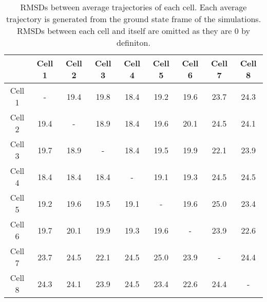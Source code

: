 \begin{table}[ht]
\centering
  \caption{RMSDs between average trajectories of each cell. Each average trajectory is generated from the ground state frame of the simulations. RMSDs between each cell and itself are omitted as they are 0 by definiton.}
  \label{tab:rmsd_avg_between_cells}
  \begin{tabular}{S | S S S S S S S S}
     & {Cell 1} & {Cell 2} & {Cell 3} & {Cell 4} & {Cell 5} & {Cell 6} & {Cell 7} & {Cell 8} \\
  \midrule
    {Cell 1} &  {-} & 19.4 & 19.8 & 18.4 & 19.2 & 19.6 & 23.7 & 24.3 \\
    {Cell 2} & 19.4 &  {-} & 18.9 & 18.4 & 19.6 & 20.1 & 24.5 & 24.1 \\
    {Cell 3} & 19.7 & 18.9 &  {-} & 18.4 & 19.5 & 19.9 & 22.1 & 23.9 \\
    {Cell 4} & 18.4 & 18.4 & 18.4 &  {-} & 19.1 & 19.3 & 24.5 & 24.5 \\
    {Cell 5} & 19.2 & 19.6 & 19.5 & 19.1 &  {-} & 19.6 & 25.0 & 23.4 \\
    {Cell 6} & 19.7 & 20.1 & 19.9 & 19.3 & 19.6 &  {-} & 23.9 & 22.6 \\
    {Cell 7} & 23.7 & 24.5 & 22.1 & 24.5 & 25.0 & 23.9 &  {-} & 24.4 \\
    {Cell 8} & 24.3 & 24.1 & 23.9 & 24.5 & 23.4 & 22.6 & 24.4 &  {-} \\
  \end{tabular}
\end{table}


